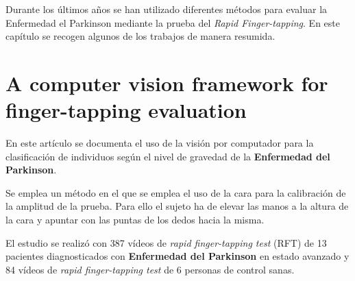 
Durante los últimos años se han utilizado diferentes métodos para evaluar la Enfermedad el Parkinson mediante la prueba del \textit{Rapid Finger-tapping}. En este capítulo se recogen algunos de los trabajos de manera resumida.

\section{A computer vision framework for finger-tapping evaluation}

En este artículo se documenta el uso de la visión por computador para la clasificación de individuos según el nivel de gravedad de la \textbf{Enfermedad del Parkinson}.

Se emplea un método en el que se emplea el uso de la cara para la calibración de la amplitud de la prueba. Para ello el sujeto ha de elevar las manos a la altura de la cara y apuntar con las puntas de los dedos hacia la misma.

El estudio se realizó con 387 vídeos de \textit{rapid finger-tapping test} (RFT) de 13 pacientes diagnosticados con \textbf{Enfermedad del Parkinson} en estado avanzado y 84 vídeos de \textit{rapid finger-tapping test} de 6 personas de control sanas.

